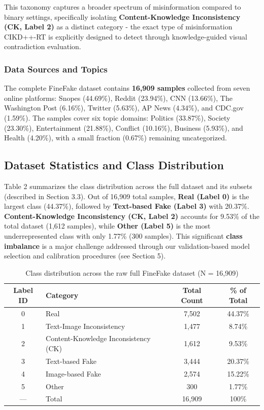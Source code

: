 This taxonomy captures a broader spectrum of misinformation compared to binary settings, specifically isolating \textbf{Content-Knowledge Inconsistency (CK, Label 2)} as a distinct category - the exact type of misinformation CIKD++-RT is explicitly designed to detect through knowledge-guided visual contradiction evaluation.

\subsubsection{Data Sources and Topics}
The complete FineFake dataset contains \textbf{16,909 samples} collected from seven online platforms: Snopes (44.69\%), Reddit (23.94\%), CNN (13.66\%), The Washington Post (6.16\%), Twitter (5.63\%), AP News (4.34\%), and CDC.gov (1.59\%). The samples cover six topic domains: Politics (33.87\%), Society (23.30\%), Entertainment (21.88\%), Conflict (10.16\%), Business (5.93\%), and Health (4.20\%), with a small fraction (0.67\%) remaining uncategorized.

\subsection{Dataset Statistics and Class Distribution}
Table 2 summarizes the class distribution across the full dataset and its subsets (described in Section 3.3). Out of 16,909 total samples, \textbf{Real (Label 0)} is the largest class (44.37\%), followed by \textbf{Text-based Fake (Label 3)} with 20.37\%. \textbf{Content-Knowledge Inconsistency (CK, Label 2)} accounts for 9.53\% of the total dataset (1,612 samples), while \textbf{Other (Label 5)} is the most underrepresented class with only 1.77\% (300 samples). This significant \textbf{class imbalance} is a major challenge addressed through our validation-based model selection and calibration procedures (see Section 5).

\begin{table}[!t]
\centering
\caption{Class distribution across the raw full FineFake dataset (N = 16,909)}
\begin{tabularx}{\textwidth}{|c|X|c|c|}
\hline
\textbf{Label ID} & \textbf{Category} & \textbf{Total Count} & \textbf{\% of Total} \\
\hline
0 & Real & 7,502 & 44.37\% \\
\hline
1 & Text-Image Inconsistency & 1,477 & 8.74\% \\
\hline
2 & Content-Knowledge Inconsistency (CK) & 1,612 & 9.53\% \\
\hline
3 & Text-based Fake & 3,444 & 20.37\% \\
\hline
4 & Image-based Fake & 2,574 & 15.22\% \\
\hline
5 & Other & 300 & 1.77\% \\
\hline
— & Total & 16,909 & 100\% \\
\hline
\end{tabularx}
\end{table}

